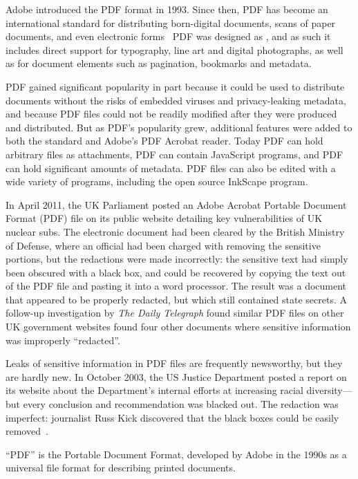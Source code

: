 Adobe introduced the PDF format in 1993. Since then, PDF has become an
international standard for distributing born-digital documents, scans
of paper documents, and even electronic forms~ 
PDF was designed as , and as
such it includes direct support for typography, line art and digital
photographs, as well as for document elements such as pagination,
bookmarks and metadata. 

PDF gained significant popularity in part because it could be used to 
distribute documents without the  risks of embedded viruses and
privacy-leaking metadata, and because PDF files could not be readily
modified after they were produced and distributed. But as PDF's popularity grew, additional
features were added to both the standard and Adobe's PDF Acrobat
reader. Today PDF can hold arbitrary files as attachments, PDF can
contain JavaScript programs, and PDF can hold significant amounts of
metadata. PDF files can also be edited with a wide variety of
programs, including the open source InkScape program.




In April 2011, the UK Parliament posted an
Adobe Acrobat Portable Document Format (PDF) file on its public website detailing key vulnerabilities of
UK nuclear subs. The electronic document had been cleared by the
British Ministry of Defense, where an official had been charged with
removing the sensitive portions, but the redactions were made incorrectly: the sensitive text had
simply been obscured with a black box, and could be
recovered by  copying the text out of the PDF file and pasting
it into a word processor. The
result was a document that appeared to  be properly redacted, but
which still contained state secrets.  A follow-up investigation by
\emph{The Daily Telegraph} found similar  PDF files on other UK government websites
found four other documents where sensitive
information was improperly ``redacted''\cite{telegraph-april2011-secrets}.

Leaks of sensitive information  in PDF files are frequently
newsworthy, but they are hardly new. In October 2003, the US Justice
Department posted a report on its website about the Department's
internal efforts at increasing racial diversity---but every conclusion and
recommendation was blacked out. The
redaction was imperfect: journalist
Russ Kick discovered that the black boxes
could be easily removed~\cite{nyt-diversity-critical}. 

``PDF'' is the Portable Document Format, developed by Adobe in the
1990s as a universal file format for describing printed documents. 

